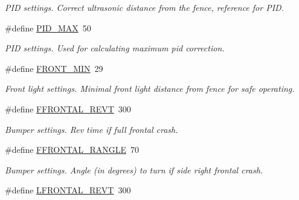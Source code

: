 \begin{DoxyCompactItemize}
\begin{DoxyCompactList}\small\item\em PID settings. Correct ultrasonic distance from the fence, reference for PID. \item\end{DoxyCompactList}\item 
\hypertarget{fence_8nxc_a2ded3bab320b6ac387798d39189fb505}{
\#define \hyperlink{fence_8nxc_a2ded3bab320b6ac387798d39189fb505}{PID\_\-MAX}~50}
\label{fence_8nxc_a2ded3bab320b6ac387798d39189fb505}

\begin{DoxyCompactList}\small\item\em PID settings. Used for calculating maximum pid correction. \item\end{DoxyCompactList}\item 
\hypertarget{fence_8nxc_ac9341f36c8b85c8d70f06973c2d9a5bd}{
\#define \hyperlink{fence_8nxc_ac9341f36c8b85c8d70f06973c2d9a5bd}{FRONT\_\-MIN}~29}
\label{fence_8nxc_ac9341f36c8b85c8d70f06973c2d9a5bd}

\begin{DoxyCompactList}\small\item\em Front light settings. Minimal front light distance from fence for safe operating. \item\end{DoxyCompactList}\item 
\hypertarget{fence_8nxc_acb1164349a1fa4b7052e28f7c7c735d4}{
\#define \hyperlink{fence_8nxc_acb1164349a1fa4b7052e28f7c7c735d4}{FFRONTAL\_\-REVT}~300}
\label{fence_8nxc_acb1164349a1fa4b7052e28f7c7c735d4}

\begin{DoxyCompactList}\small\item\em Bumper settings. Rev time if full frontal crash. \item\end{DoxyCompactList}\item 
\hypertarget{fence_8nxc_abda398fa4722b8691dc8c52c733a2814}{
\#define \hyperlink{fence_8nxc_abda398fa4722b8691dc8c52c733a2814}{FFRONTAL\_\-RANGLE}~70}
\label{fence_8nxc_abda398fa4722b8691dc8c52c733a2814}

\begin{DoxyCompactList}\small\item\em Bumper settings. Angle (in degrees) to turn if side right frontal crash. \item\end{DoxyCompactList}\item 
\hypertarget{fence_8nxc_aac0491bc7a39228e57b85de235ef59eb}{
\#define \hyperlink{fence_8nxc_aac0491bc7a39228e57b85de235ef59eb}{LFRONTAL\_\-REVT}~300}
\label{fence_8nxc_aac0491bc7a39228e57b85de235ef59eb}


\end{DoxyCompactItemize}
